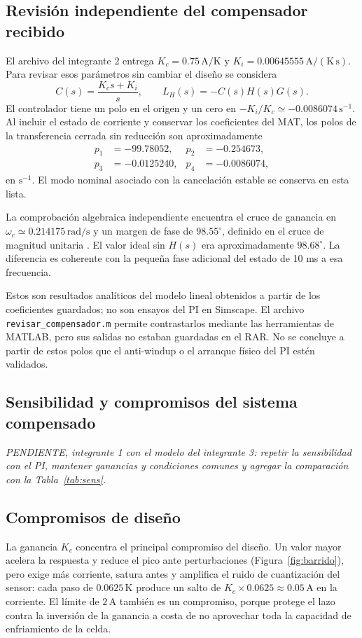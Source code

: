 \documentclass[journal,twocolumn]{IEEEtran}
\begin{document}
\subsection{Revisión independiente del compensador recibido}\label{sec:revisionPI}
El archivo del integrante 2 entrega $K_c=0.75\,\mathrm{A/K}$ y $K_i=0.00645555\,\mathrm{A/(K\,s)}$. Para revisar esos parámetros sin cambiar el diseño se considera
\begin{equation}
C(s)=\frac{K_cs+K_i}{s},\qquad L_H(s)=-C(s)H(s)G(s).
\end{equation}
El controlador tiene un polo en el origen y un cero en $-K_i/K_c\simeq-0.0086074\,\mathrm{s^{-1}}$. Al incluir el estado de corriente y conservar los coeficientes del MAT, los polos de la transferencia cerrada sin reducción son aproximadamente
\begin{align}
 p_1&=-99.78052, &p_2&=-0.254673,\\
 p_3&=-0.0125240, &p_4&=-0.0086074,
\end{align}
en $\mathrm{s^{-1}}$. El modo nominal asociado con la cancelación estable se conserva en esta lista.

La comprobación algebraica independiente encuentra el cruce de ganancia en $\omega_c\simeq0.214175\,\mathrm{rad/s}$ y un margen de fase de $98.55^{\circ}$, definido en el cruce de magnitud unitaria \cite{mw_margin}. El valor ideal sin $H(s)$ era aproximadamente $98.68^{\circ}$. La diferencia es coherente con la pequeña fase adicional del estado de 10 ms a esa frecuencia.

Estos son resultados analíticos del modelo lineal obtenidos a partir de los coeficientes guardados; no son ensayos del PI en Simscape. El archivo \texttt{revisar\_compensador.m} permite contrastarlos mediante las herramientas de MATLAB, pero sus salidas no estaban guardadas en el RAR. No se concluye a partir de estos polos que el anti-windup o el arranque físico del PI estén validados.

\subsection{Sensibilidad y compromisos del sistema compensado}
\textit{PENDIENTE, integrante 1 con el modelo del integrante 3: repetir la sensibilidad con el PI, mantener ganancias y condiciones comunes y agregar la comparación con la Tabla~\ref{tab:sens}.}

\subsection{Compromisos de diseño}\label{sec:compromisos}
La ganancia $K_c$ concentra el principal compromiso del diseño. Un valor mayor acelera la respuesta y reduce el pico ante perturbaciones (Figura~\ref{fig:barrido}), pero exige más corriente, satura antes y amplifica el ruido de cuantización del sensor: cada paso de $0.0625\,\mathrm K$ produce un salto de $K_c\times0.0625\approx0.05\,\mathrm A$ en la corriente. El límite de $2\,\mathrm A$ también es un compromiso, porque protege el lazo contra la inversión de la ganancia a costa de no aprovechar toda la capacidad de enfriamiento de la celda.
\end{document}
